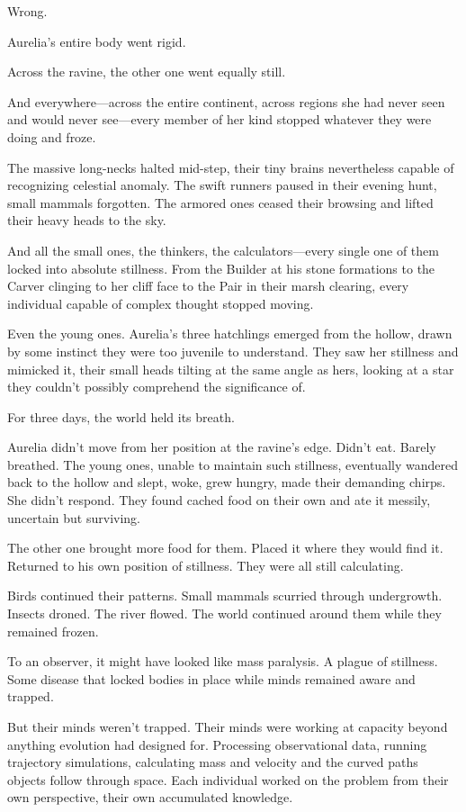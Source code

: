 Wrong.

Aurelia's entire body went rigid.

Across the ravine, the other one went equally still.

And everywhere—across the entire continent, across regions she had never seen and would never see—every member of her kind stopped whatever they were doing and froze.

The massive long-necks halted mid-step, their tiny brains nevertheless capable of recognizing celestial anomaly. The swift runners paused in their evening hunt, small mammals forgotten. The armored ones ceased their browsing and lifted their heavy heads to the sky.

And all the small ones, the thinkers, the calculators—every single one of them locked into absolute stillness. From the Builder at his stone formations to the Carver clinging to her cliff face to the Pair in their marsh clearing, every individual capable of complex thought stopped moving.

Even the young ones. Aurelia's three hatchlings emerged from the hollow, drawn by some instinct they were too juvenile to understand. They saw her stillness and mimicked it, their small heads tilting at the same angle as hers, looking at a star they couldn't possibly comprehend the significance of.

For three days, the world held its breath.

\scenebreak

Aurelia didn't move from her position at the ravine's edge. Didn't eat. Barely breathed. The young ones, unable to maintain such stillness, eventually wandered back to the hollow and slept, woke, grew hungry, made their demanding chirps. She didn't respond. They found cached food on their own and ate it messily, uncertain but surviving.

The other one brought more food for them. Placed it where they would find it. Returned to his own position of stillness. They were all still calculating.

Birds continued their patterns. Small mammals scurried through undergrowth. Insects droned. The river flowed. The world continued around them while they remained frozen.

To an observer, it might have looked like mass paralysis. A plague of stillness. Some disease that locked bodies in place while minds remained aware and trapped.

But their minds weren't trapped. Their minds were working at capacity beyond anything evolution had designed for. Processing observational data, running trajectory simulations, calculating mass and velocity and the curved paths objects follow through space. Each individual worked on the problem from their own perspective, their own accumulated knowledge.

